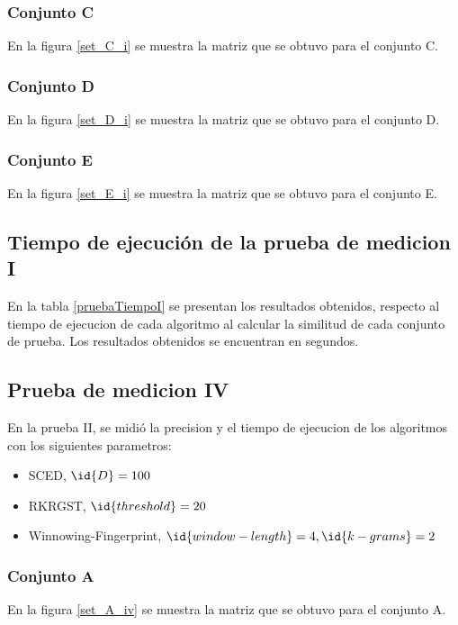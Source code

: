 \subsubsection{Conjunto C}
En la figura \ref{set_C_i} se muestra la matriz que se obtuvo para el conjunto C.


\subsubsection{Conjunto D}
En la figura \ref{set_D_i} se muestra la matriz que se obtuvo para el conjunto D.


\subsubsection{Conjunto E}
En la figura \ref{set_E_i} se muestra la matriz que se obtuvo para el conjunto E.



\subsection{Tiempo de ejecución de la prueba de medicion I}
En la tabla \ref{pruebaTiempoI} se presentan los resultados obtenidos, respecto al tiempo de ejecucion de cada algoritmo al calcular la similitud de cada conjunto de prueba. Los resultados obtenidos se encuentran en segundos.



\subsection{Prueba de medicion IV}
En la prueba II, se midió la precision y el tiempo de ejecucion de los algoritmos con los siguientes parametros:
\begin{itemize}
  \item SCED, $\id{D} = 100$
  \item RKRGST, $\id{threshold} = 20$
  \item Winnowing-Fingerprint, $\id{window-length} = 4, \id{k-grams} = 2$
\end{itemize}

\subsubsection{Conjunto A}
En la figura \ref{set_A_iv} se muestra la matriz que se obtuvo para el conjunto A.


